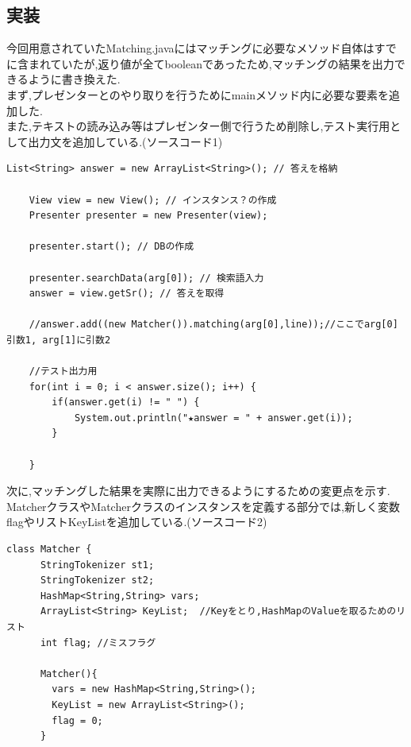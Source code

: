 \documentclass[12pt]{jarticle}
\begin{document}
\subsection{実装}
今回用意されていたMatching.javaにはマッチングに必要なメソッド自体はすでに含まれていたが,返り値が全てbooleanであったため,マッチングの結果を出力できるように書き換えた.\\

まず,プレゼンターとのやり取りを行うためにmainメソッド内に必要な要素を追加した.\\
また,テキストの読み込み等はプレゼンター側で行うため削除し,テスト実行用として出力文を追加している.(ソースコード1)
\begin{lstlisting}[caption=mainメソッドの変更, label=mid]
List<String> answer = new ArrayList<String>(); // 答えを格納

	View view = new View(); // インスタンス？の作成
	Presenter presenter = new Presenter(view);

	presenter.start(); // DBの作成

	presenter.searchData(arg[0]); // 検索語入力
	answer = view.getSr(); // 答えを取得

	//answer.add((new Matcher()).matching(arg[0],line));//ここでarg[0]引数1, arg[1]に引数2

	//テスト出力用
	for(int i = 0; i < answer.size(); i++) {
		if(answer.get(i) != " ") {
			System.out.println("★answer = " + answer.get(i));
		}

	}
\end{lstlisting}

次に,マッチングした結果を実際に出力できるようにするための変更点を示す.\\
MatcherクラスやMatcherクラスのインスタンスを定義する部分では,新しく変数flagやリストKeyListを追加している.(ソースコード2)
\begin{lstlisting}[caption=追加要素, label=mid]
class Matcher {
	  StringTokenizer st1;
	  StringTokenizer st2;
	  HashMap<String,String> vars;
	  ArrayList<String> KeyList;  //Keyをとり,HashMapのValueを取るためのリスト
	  int flag;	//ミスフラグ

	  Matcher(){
		vars = new HashMap<String,String>();
		KeyList = new ArrayList<String>();
		flag = 0;
	  }
\end{lstlisting}
\end{document}
